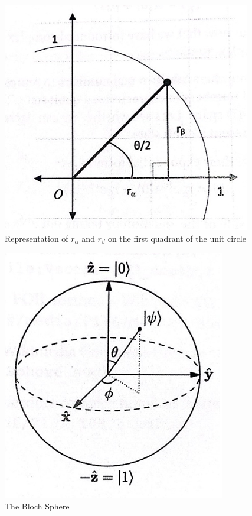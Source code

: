 \documentclass[conference]{IEEEtran}
\begin{document}
\begin{figure}[htbp]
	\centerline{\includegraphics[scale=0.8]{circle.png}}
	\caption{Representation of $r_\alpha$ and $r_\beta$ on the first quadrant of the unit circle \cite{b14}}
	\label{fig4}
\end{figure}

\begin{figure}[htbp]
	\centerline{\includegraphics[scale=0.8]{block.png}}
	\caption{The Bloch Sphere \cite{b14}}
	\label{fig5}
\end{figure}
\end{document}
